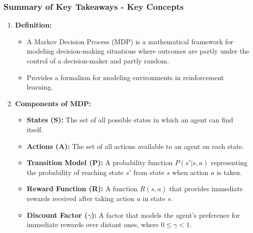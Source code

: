 \documentclass[aspectratio=169]{beamer}
\begin{document}
\begin{frame}[fragile]
    \frametitle{Summary of Key Takeaways - Key Concepts}
    \begin{enumerate}
        \item \textbf{Definition:} 
        \begin{itemize}
            \item A Markov Decision Process (MDP) is a mathematical framework for modeling decision-making situations where outcomes are partly under the control of a decision-maker and partly random.
            \item Provides a formalism for modeling environments in reinforcement learning.
        \end{itemize}
        
        \item \textbf{Components of MDP:}
        \begin{itemize}
            \item \textbf{States (S):} The set of all possible states in which an agent can find itself.
            \item \textbf{Actions (A):} The set of all actions available to an agent on each state.
            \item \textbf{Transition Model (P):} A probability function \( P(s'|s,a) \) representing the probability of reaching state \( s' \) from state \( s \) when action \( a \) is taken.
            \item \textbf{Reward Function (R):} A function \( R(s,a) \) that provides immediate rewards received after taking action \( a \) in state \( s \).
            \item \textbf{Discount Factor (\( \gamma \)):} A factor that models the agent's preference for immediate rewards over distant ones, where \( 0 \leq \gamma < 1 \).
        \end{itemize}
    \end{enumerate}
\end{frame}
\end{document}
